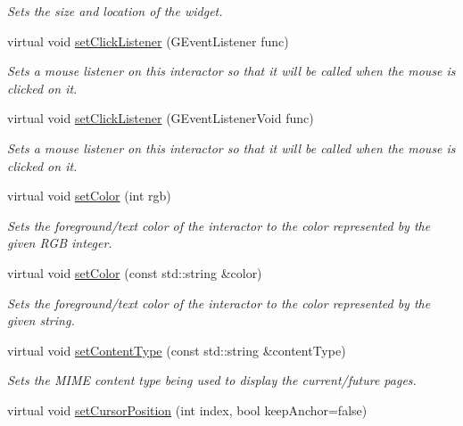 \begin{DoxyCompactItemize}
\begin{DoxyCompactList}\small\item\em Sets the size and location of the widget. \end{DoxyCompactList}\item 
virtual void \mbox{\hyperlink{classGInteractor_abd40af6921242584d0954f173911b190}{set\+Click\+Listener}} (G\+Event\+Listener func)
\begin{DoxyCompactList}\small\item\em Sets a mouse listener on this interactor so that it will be called when the mouse is clicked on it. \end{DoxyCompactList}\item 
virtual void \mbox{\hyperlink{classGInteractor_a856414c92df90f56f3877475eb3f8fc4}{set\+Click\+Listener}} (G\+Event\+Listener\+Void func)
\begin{DoxyCompactList}\small\item\em Sets a mouse listener on this interactor so that it will be called when the mouse is clicked on it. \end{DoxyCompactList}\item 
virtual void \mbox{\hyperlink{classGInteractor_ab1f5cc0f5cc6bbbd716a526c61f1081d}{set\+Color}} (int rgb)
\begin{DoxyCompactList}\small\item\em Sets the foreground/text color of the interactor to the color represented by the given R\+GB integer. \end{DoxyCompactList}\item 
virtual void \mbox{\hyperlink{classGInteractor_a61374df6c11b52cfbb0815decdbaebc6}{set\+Color}} (const std\+::string \&color)
\begin{DoxyCompactList}\small\item\em Sets the foreground/text color of the interactor to the color represented by the given string. \end{DoxyCompactList}\item 
virtual void \mbox{\hyperlink{classGBrowserPane_a0ba11f3ad4f6257759f0db3dd791e6a4}{set\+Content\+Type}} (const std\+::string \&content\+Type)
\begin{DoxyCompactList}\small\item\em Sets the M\+I\+ME content type being used to display the current/future pages. \end{DoxyCompactList}\item 
virtual void \mbox{\hyperlink{classGBrowserPane_a5817e10a86be5cd41b3668d8fccb10e0}{set\+Cursor\+Position}} (int index, bool keep\+Anchor=false)

\end{DoxyCompactItemize}
